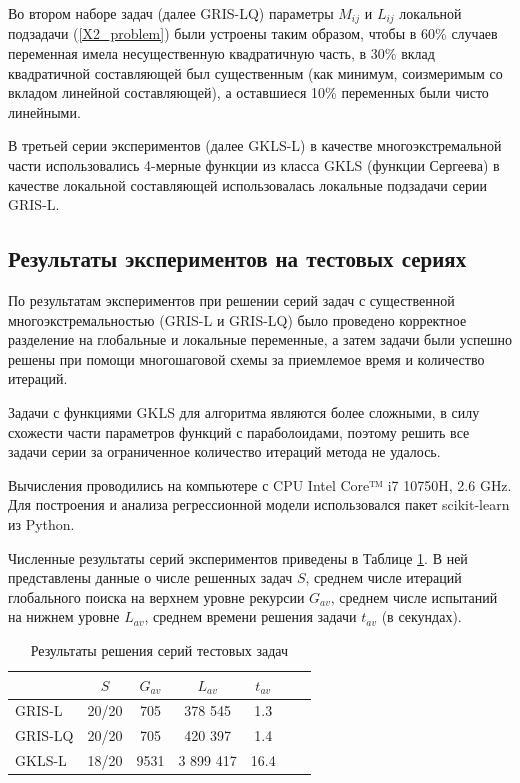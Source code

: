 \documentclass[11pt, oneside, a4paper]{article}
\begin{document}
Во втором наборе задач (далее GRIS-LQ) параметры $M_{ij}$ и $L_{ij}$ локальной подзадачи (\ref{X2_problem}) были устроены таким образом, чтобы в 60\% случаев переменная имела несущественную квадратичную часть, в 30\% вклад квадратичной составляющей был существенным (как минимум, соизмеримым со вкладом линейной составляющей), а оставшиеся 10\% переменных были чисто линейными.

В третьей серии экспериментов (далее GKLS-L) в качестве многоэкстремальной части использовались 4-мерные функции из класса GKLS (функции Сергеева) \cite{Sergeyev2013} в качестве локальной составляющей использовалась локальные подзадачи серии GRIS-L.

\subsection{Результаты экспериментов на тестовых сериях}

По результатам экспериментов при решении серий задач с существенной многоэкстремальностью (GRIS-L и GRIS-LQ) было проведено корректное разделение на глобальные и локальные переменные, а затем задачи были успешно решены при помощи многошаговой схемы за приемлемое время и количество итераций.

Задачи с функциями GKLS для алгоритма являются более сложными, в силу схожести части параметров функций с параболоидами, поэтому решить все задачи серии за ограниченное количество итераций метода не удалось.

Вычисления проводились на компьютере с CPU Intel Core™ i7 10750H, 2.6 GHz. Для построения и анализа регрессионной модели использовался пакет scikit-learn из Python.

Численные результаты серий экспериментов приведены в Таблице \ref{tab1}. В ней представлены данные о числе решенных задач $S$, среднем числе итераций глобального поиска на верхнем уровне рекурсии $G_{av}$, среднем числе испытаний на нижнем уровне $L_{av}$, среднем времени решения задачи $t_{av}$ (в секундах).

\begin{table}[ht]
	\caption{Результаты решения серий тестовых задач}
	\label{tab1}
	\begin{center}
		\begin{tabular}{ l c c c c c c } \hline
		 & $S$ &  $G_{av}$ &  $L_{av}$ & $t_{av}$ \\
    \hline
		GRIS-L & 20/20  & 705 &  378 545 & 1.3 \\
		GRIS-LQ & 20/20 & 705 &  420 397 & 1.4 \\
		GKLS-L & 18/20 & 9531 &  3 899 417 & 16.4 \\
		\hline
		\end{tabular}
	\end{center}
\end{table}
\end{document}
